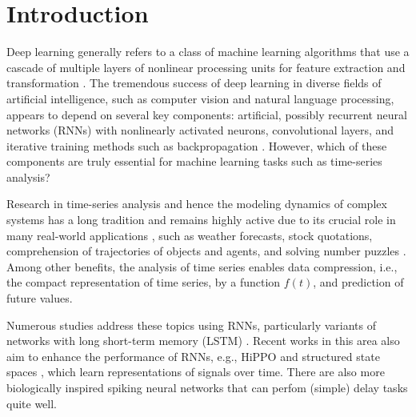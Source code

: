 \documentclass{sn-jnl}
\theoremstyle{definition}
\begin{document}


\maketitle

\section{Introduction}
Deep learning generally refers to a class of machine learning algorithms that use a 
cascade of multiple layers of nonlinear processing units for feature extraction 
and transformation \citep{DY14}. The tremendous success of deep learning in 
diverse fields of artificial intelligence, such as computer vision and natural 
language processing, appears to depend on several key components: artificial, 
possibly recurrent neural networks (RNNs) with nonlinearly activated neurons, 
convolutional layers, and iterative training methods such as backpropagation 
\citep{GBC16}. However, which of these components are truly essential for machine 
learning tasks such as time-series analysis?

Research in time-series analysis and hence the modeling dynamics of complex systems 
has a long tradition and remains highly active due to its crucial role in many 
real-world applications \citep{LBE15}, such as weather forecasts, stock quotations, 
comprehension of trajectories of objects and agents, and solving number puzzles 
\citep{RK11,GW13}. Among other benefits, the analysis of time series enables data 
compression, i.e., the compact representation of time series, by a function 
$f(t)$, and prediction of future values.

Numerous studies address these topics using RNNs, particularly variants of 
networks with long short-term memory (LSTM) \citep{HS97}. Recent works in this
area also aim to enhance the performance of RNNs, e.g., HiPPO \citep{GDE+20} and
structured state spaces \citep{GGR22,WKF+25}, which learn representations of signals
over time. There are also more biologically inspired spiking neural networks
\citep{KK+22} that can perfom (simple) delay tasks quite well.
\end{document}
